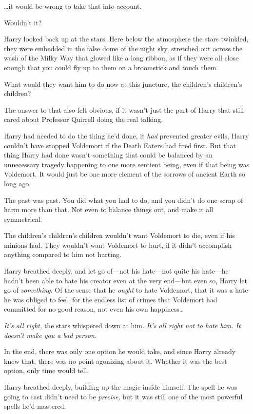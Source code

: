 …it would be wrong to take that into account.

Wouldn’t it?

Harry looked back up at the stars. Here below the atmosphere the stars twinkled, they were embedded in the false dome of the night sky, stretched out across the wash of the Milky Way that glowed like a long ribbon, as if they were all close enough that you could fly up to them on a broomstick and touch them.

What would they want him to do now at this juncture, the children’s children’s children?

The answer to that also felt obvious, if it wasn’t just the part of Harry that still cared about Professor Quirrell doing the real talking.

Harry had needed to do the thing he’d done, it \emph{had} prevented greater evils, Harry couldn’t have stopped Voldemort if the Death Eaters had fired first. But that thing Harry had done wasn’t something that could be balanced by an unnecessary tragedy happening to one more sentient being, even if that being was Voldemort. It would just be one more element of the sorrows of ancient Earth so long ago.

The past was past. You did what you had to do, and you didn’t do one scrap of harm more than that. Not even to balance things out, and make it all symmetrical.

The children’s children’s children wouldn’t want Voldemort to die, even if his minions had. They wouldn’t want Voldemort to hurt, if it didn’t accomplish anything compared to him not hurting.

Harry breathed deeply, and let go of—not his hate—not quite his hate—he hadn’t been able to hate his creator even at the very end—but even so, Harry let go of \emph{something}. Of the sense that he \emph{ought} to hate Voldemort, that it was a hate he was obliged to feel, for the endless list of crimes that Voldemort had committed for no good reason, not even his own happiness…

\emph{It’s all right,} the stars whispered down at him. \emph{It’s all right not to hate him. It doesn’t make you a bad person.}

In the end, there was only one option he would take, and since Harry already knew that, there was no point agonizing about it. Whether it was the best option, only time would tell.

Harry breathed deeply, building up the magic inside himself. The spell he was going to cast didn’t need to be \emph{precise,} but it was still one of the most powerful spells he’d mastered.

